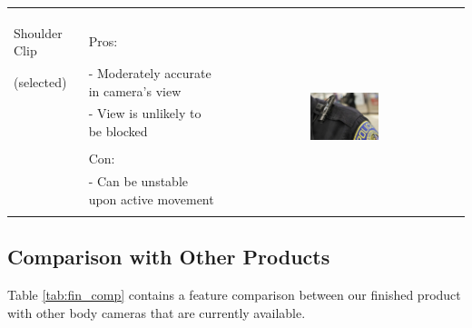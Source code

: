 \documentclass[12pt]{article}
\begin{document}
\begin{table}[h!]
\begin{tabular}{|l|l|c|}
                   & & \\
                   & & \\
        \hline
        & & \\
        Shoulder Clip & Pros: & \multirow{7}{*}{\includegraphics[width=0.3\textwidth]{shoulder_mount}}\\
        (selected) & - Moderately accurate in camera's view & \\
                   & - View is unlikely to be blocked & \\
                   & & \\
                   & Con: & \\
                   & - Can be unstable upon active movement  & \\
                   & & \\
        \hline
    \end{tabular}
    \label{tab:cam_mount}
\end{table}

\subsection{Comparison with Other Products}
Table \ref{tab:fin_comp} contains a feature comparison between our finished
product with other body cameras that are currently available.
\end{document}
